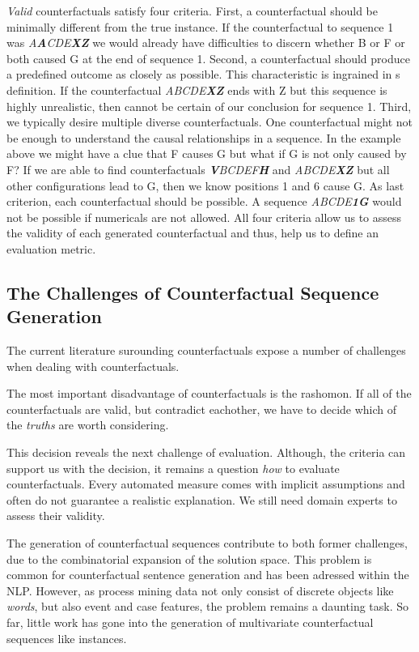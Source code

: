 \documentclass[12pt,a4paper]{report}
\begin{document}
\emph{Valid} counterfactuals satisfy four criteria. First, a counterfactual should be minimally different from the true instance. If the counterfactual to sequence 1 was \textit{A\textbf{A}CDE\textbf{XZ}} we would already have difficulties to discern whether B or F or both caused G at the end of sequence 1. Second, a counterfactual should produce a predefined outcome as closely as possible. This characteristic is ingrained in \citeauthor{molnar2019}s definition. If the counterfactual \textit{ABCDE\textbf{XZ}} ends with Z but this sequence is highly unrealistic, then cannot be certain of our conclusion for sequence 1. Third, we typically desire multiple diverse counterfactuals.  One counterfactual might not be enough to understand the causal relationships in a sequence. In the example above we might have a clue that F causes G but what if G is not only caused by F? If we are able to find counterfactuals \textit{\textbf{V}BCDEF\textbf{H}} and \textit{ABCDE\textbf{XZ}} but all other configurations lead to G, then we know positions 1 and 6 cause G. As last criterion, each counterfactual should be possible. A sequence \textit{ABCDE\textbf{1G}} would not be possible if numericals are not allowed. All four criteria allow us to assess the validity of each generated counterfactual and thus, help us to define an evaluation metric.

\subsection{The Challenges of Counterfactual Sequence Generation}
The current literature surounding counterfactuals expose a number of challenges when dealing with counterfactuals.

The most important disadvantage of counterfactuals is the \gls{rashomon}\autocite[ch. 9.3]{molnar2019}. If all of the counterfactuals are valid, but contradict eachother, we have to decide which of the \emph{truths} are worth considering.

This decision reveals the next challenge of evaluation\needscite. Although, the criteria can support us with the decision, it remains a question \emph{how} to evaluate counterfactuals. Every automated measure comes with implicit assumptions and often do not guarantee a realistic explanation. We still need domain experts to assess their validity.

The generation of counterfactual sequences contribute to both former challenges, due to the combinatorial expansion of the solution space. This problem is common for counterfactual sentence generation and has been adressed within the \gls{NLP}\needscite. However, as process mining data not only consist of discrete objects like \emph{words}, but also event and case features, the problem remains a daunting task. So far, little work has gone into the generation of multivariate counterfactual sequences like \glspl{instance}\needscite.
\end{document}
